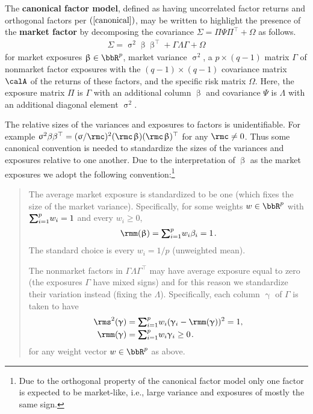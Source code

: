 \documentclass[leqno,12pt]{article}
\begin{document}
{The {\bf canonical factor model}, defined as having uncorrelated
factor returns and orthogonal factors per $\req{canonical}$, may be written to 
highlight the presence of the {\bf market factor} by decomposing
the covariance $\Sigma = \Pi \Psi \Pi^\top + \Omega$ as follows.
\begin{align}
  \Sigma = \upsigma^2 \upbeta  \upbeta^\top  
  + \Gamma \Lambda \Gamma + \Omega
\end{align}
for market exposures $\upbeta \in \bbR^p$, market variance
$\upsigma^2$, a $p \times (q-1)$ matrix $\Gamma$ of nonmarket
factor exposures with the $(q-1) \times (q-1)$
covariance matrix $\calA$ of the returns of these factors,
and the specific risk matrix $\Omega$. Here, the exposure
matrix $\Pi$ is $\Gamma$ with an additional column $\upbeta$
and covariance $\Psi$ is $\Lambda$ with an additional
diagonal element $\upsigma^2$.

\begin{mdframed}[style=clean]
  The relative sizes of the variances and 
exposures to factors is unidentifiable. For example 
$\upsigma^2 \beta \beta^\top = (\upsigma/\rmc)^2
(\rmc \s \upbeta) (\rmc\s \upbeta)^\top$  for any $\rmc \neq 0$.
Thus some canonical convention is needed to standardize
the sizes of the variances and exposures relative to one
another. Due to the interpretation of $\upbeta$ as the
market exposures we adopt the following convention:\footnote{Due
to the orthogonal property of the canonical factor model
only one factor is expected to be market-like, i.e., large
variance and exposures of mostly the same sign.}
\begin{quote}
  The average market exposure is standardized to be one
(which fixes the size of the market variance). Specifically,
for some weights $w \in \bbR^p$ with 
$\tsum_{i=1}^p w_i = 1$ and every $w_i \ge 0$,
\begin{align}
\rmm (\upbeta) = \tsum_{i=1}^p w_i \beta_i = 1 \s .
\end{align}
The standard choice is every $w_i = 1/p$ (unweighted mean).

The nonmarket factors in $\Gamma \Lambda \Gamma^\top$ 
may have average exposure equal to 
zero (the exposures $\Gamma$ have mixed signs) and for this
reason we standardize their variation instead (fixing
the $\Lambda$). Specifically,
each column $\upgamma$ of $\Gamma$ is taken to have
\begin{equation}
\begin{aligned}
 \rms^2(\upgamma) &= \tsum_{i=1}^p w_i (\upgamma_i - 
 \rmm(\upgamma))^2 = 1 , \\
 \rmm(\upgamma) &= \tsum_{i=1}^p w_i \upgamma_i \ge 0 \s .
\end{aligned}
\end{equation}
for any weight vector $w \in \bbR^p$ as above.
\end{quote}
\end{mdframed}

}
\end{document}
